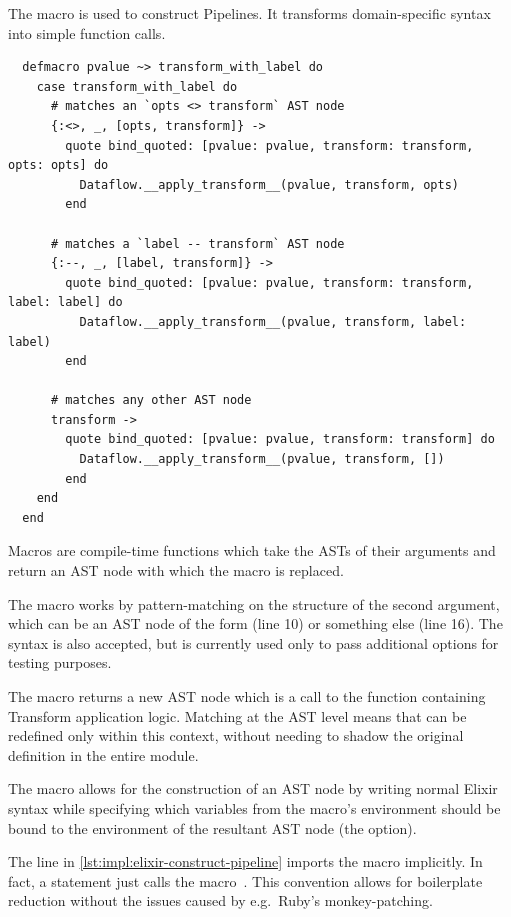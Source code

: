 \begin{listing}[h]
	\caption[The definition of the \exs{~>} macro for constructing Pipelines.]{The \exs{~>} macro is used to construct Pipelines. It transforms domain-specific syntax into simple function calls.}
	\label{lst:impl:elixir-dpipe-macro-def}
	\begin{verbatim}
  defmacro pvalue ~> transform_with_label do
    case transform_with_label do
      # matches an `opts <> transform` AST node
      {:<>, _, [opts, transform]} ->
        quote bind_quoted: [pvalue: pvalue, transform: transform, opts: opts] do
          Dataflow.__apply_transform__(pvalue, transform, opts)
        end
        
      # matches a `label -- transform` AST node
      {:--, _, [label, transform]} ->
        quote bind_quoted: [pvalue: pvalue, transform: transform, label: label] do
          Dataflow.__apply_transform__(pvalue, transform, label: label)
        end
      
      # matches any other AST node
      transform ->
        quote bind_quoted: [pvalue: pvalue, transform: transform] do
          Dataflow.__apply_transform__(pvalue, transform, [])
        end
    end
  end
	\end{verbatim}
\end{listing}

Macros are compile-time functions which take the ASTs of their arguments and return an AST node with which the macro is replaced.

The \exs{~>} macro works by pattern-matching on the structure of the second argument, which can be an AST node of the form  (line 10) or something else (line 16).
The  syntax is also accepted, but is currently used only to pass additional options for testing purposes.

The macro returns a new AST node which is a call to the  function containing Transform application logic.
Matching at the AST level means that \exs{--} can be redefined only within this context, without needing to shadow the original definition in the entire module.

The  macro allows for the construction of an AST node by writing normal Elixir syntax while specifying which variables from the macro's environment should be bound to the environment of the resultant AST node (the  option).

The  line in \cref{lst:impl:elixir-construct-pipeline} imports the \exs{~>} macro implicitly.
In fact, a  statement just calls the  macro~\cite[p.~35]{Elixir-Metaprogramming}.
This convention allows for boilerplate reduction without the issues caused by e.g.\ Ruby's monkey-patching.


